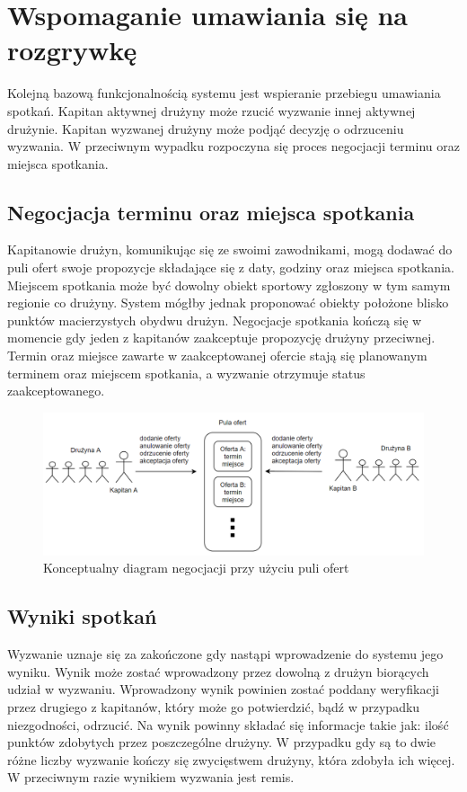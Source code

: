 \section{Wspomaganie umawiania się na rozgrywkę}

Kolejną bazową funkcjonalnością systemu jest wspieranie przebiegu umawiania spotkań. Kapitan aktywnej drużyny może rzucić wyzwanie innej aktywnej drużynie. Kapitan wyzwanej drużyny może podjąć decyzję o odrzuceniu wyzwania. W przeciwnym wypadku rozpoczyna się proces negocjacji terminu oraz miejsca spotkania. 

\subsection{Negocjacja terminu oraz miejsca spotkania}

Kapitanowie drużyn, komunikując się ze swoimi zawodnikami, mogą dodawać do puli ofert swoje propozycje składające się z daty, godziny oraz miejsca spotkania. Miejscem spotkania może być dowolny obiekt sportowy zgłoszony w tym samym regionie co drużyny. System mógłby jednak proponować obiekty położone blisko punktów macierzystych obydwu drużyn. Negocjacje spotkania kończą się w momencie gdy jeden z kapitanów zaakceptuje propozycję drużyny przeciwnej. Termin oraz miejsce zawarte w zaakceptowanej ofercie stają się planowanym terminem oraz miejscem spotkania, a wyzwanie otrzymuje status zaakceptowanego.

\begin{figure}[ht]
\centering
\includegraphics[width=\linewidth]{03-koncept/rys/offer-pool.PNG}
\caption{Konceptualny diagram negocjacji przy użyciu puli ofert}
\label{fig:diagram-alg-ext}
\end{figure}

\subsection{Wyniki spotkań}

Wyzwanie uznaje się za zakończone gdy nastąpi wprowadzenie do systemu jego wyniku. Wynik może zostać wprowadzony przez dowolną z drużyn biorących udział w wyzwaniu. Wprowadzony wynik powinien zostać poddany weryfikacji przez drugiego z kapitanów, który może go potwierdzić, bądź w przypadku niezgodności, odrzucić. Na wynik powinny składać się informacje takie jak: ilość punktów zdobytych przez poszczególne drużyny. W przypadku gdy są to dwie różne liczby wyzwanie kończy się zwycięstwem drużyny, która zdobyła ich więcej. W przeciwnym razie wynikiem wyzwania jest remis.


